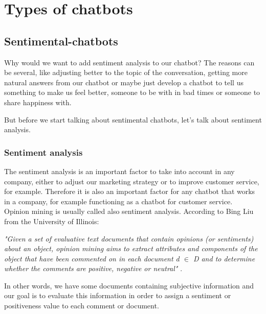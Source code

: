 \documentclass[12pt,twoside]{article}
\theoremstyle{plain}
\theoremstyle{definition}
\theoremstyle{remark}
\begin{document}
\section{Types of chatbots}
	\label{sec:types}
	



	\subsection{Sentimental-chatbots}
	\label{sec:sentimental}
	
	Why would we want to add sentiment analysis to our chatbot? The reasons can be several, like adjusting better to the topic of the conversation, getting more natural answers from our chatbot or maybe just develop a chatbot to tell us something to make us feel better, someone to be with in bad times or someone to share happiness with.
	
	\newpage
	
	But before we start talking about sentimental chatbots, let's talk about sentiment analysis.
	
		\subsubsection{Sentiment analysis}
		\label{sec::sentiment_analysis}
		
		The sentiment analysis is an important factor to take into account in any company, either to adjust our marketing strategy or to improve customer service, for example. Therefore it is also an important factor for any chatbot that works in a company, for example functioning as a chatbot for customer service.\\
		
		Opinion mining is usually called also sentiment analysis. According to Bing Liu from the University of Illinois: \\
		
		\begin{center}
			\textit{"Given a set of evaluative text documents that contain opinions (or sentiments) about an object, opinion mining aims to extract attributes and components of the object that have been commented on in each document d $\in$ D and to determine whether the comments are positive, negative or neutral"} \cite{bingliu_sentiment_definition}.
		\end{center}
		
		In other words, we have some documents containing subjective information and our goal is to evaluate this information in order to assign a sentiment or positiveness value to each comment or document.\\
		
\end{document}
